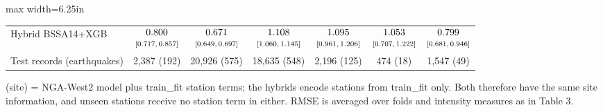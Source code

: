 \begin{table}[htbp]
\begin{adjustbox}{max width=6.25in}
\begin{tabular}{lcccccc}
Hybrid BSSA14+XGB & $\begin{array}{@{}c@{}}0.800\\[-1pt] \scriptstyle[0.717,\,0.857]\end{array}$ & $\begin{array}{@{}c@{}}0.671\\[-1pt] \scriptstyle[0.649,\,0.697]\end{array}$ & $\begin{array}{@{}c@{}}1.108\\[-1pt] \scriptstyle[1.060,\,1.145]\end{array}$ & $\begin{array}{@{}c@{}}1.095\\[-1pt] \scriptstyle[0.961,\,1.206]\end{array}$ & $\begin{array}{@{}c@{}}1.053\\[-1pt] \scriptstyle[0.707,\,1.222]\end{array}$ & $\begin{array}{@{}c@{}}0.799\\[-1pt] \scriptstyle[0.681,\,0.946]\end{array}$ \\
Test records (earthquakes) & 2,387 (192) & 20,926 (575) & 18,635 (548) & 2,196 (125) & 474 (18) & 1,547 (49) \\
\bottomrule
\end{tabular}
\end{adjustbox}
\par\smallskip
\parbox{6.25in}{\footnotesize (site) = NGA-West2 model plus train\_fit station terms; the hybrids encode stations from train\_fit only. Both therefore have the same site information, and unseen stations receive no station term in either. RMSE is averaged over folds and intensity measures as in Table 3.}
\end{table}
